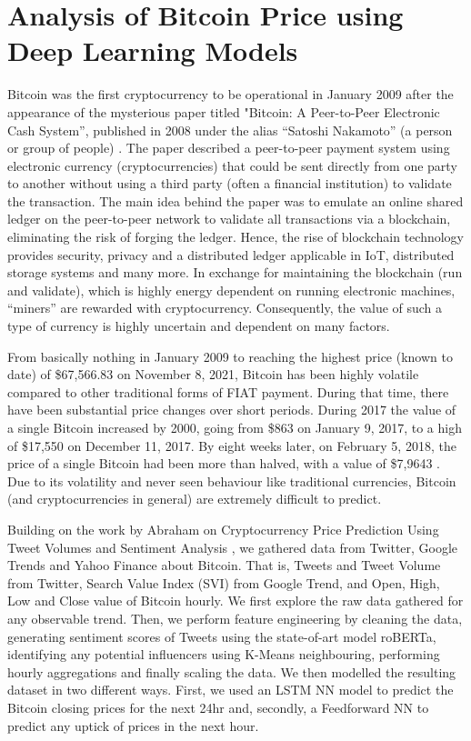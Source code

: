 \chapter{Analysis of Bitcoin Price using Deep Learning Models}
Bitcoin was the first cryptocurrency to be operational in January 2009 after the appearance of the mysterious paper titled "Bitcoin: A Peer-to-Peer Electronic Cash System”, published in 2008 under the alias “Satoshi Nakamoto” (a person or group of people) \cite{satoshi2009}. The paper described a peer-to-peer payment system using electronic currency (cryptocurrencies) that could be sent directly from one party to another without using a third party (often a financial institution) to validate the transaction. The main idea behind the paper was to emulate an online shared ledger on the peer-to-peer network to validate all transactions via a blockchain, eliminating the risk of forging the ledger. Hence, the rise of blockchain technology provides security, privacy and a distributed ledger applicable in IoT, distributed storage systems and many more. In exchange for maintaining the blockchain (run and validate), which is highly energy dependent on running electronic machines, “miners” are rewarded with cryptocurrency. Consequently, the value of such a type of currency is highly uncertain and dependent on many factors.

From basically nothing in January 2009 to reaching the highest price (known to date) of \$67,566.83 on November 8, 2021, Bitcoin has been highly volatile compared to other traditional forms of FIAT payment. During that time, there have been substantial price changes over short periods. During 2017 the value of a single Bitcoin increased by 2000, going from \$863 on January 9, 2017, to a high of \$17,550 on December 11, 2017. By eight weeks later, on February 5, 2018, the price of a single Bitcoin had been more than halved, with a value of \$7,9643 \cite{Abraham2018}. Due to its volatility and never seen behaviour like traditional currencies, Bitcoin (and cryptocurrencies in general) are extremely difficult to predict.

Building on the work by Abraham on Cryptocurrency Price Prediction Using Tweet Volumes and Sentiment Analysis \cite{Abraham2018}, we gathered data from Twitter, Google Trends and Yahoo Finance about Bitcoin. That is, Tweets and Tweet Volume from Twitter, Search Value Index (SVI) from Google Trend, and Open, High, Low and Close value of Bitcoin hourly. We first explore the raw data gathered for any observable trend. Then, we perform feature engineering by cleaning the data, generating sentiment scores of Tweets using the state-of-art model roBERTa, identifying any potential influencers using K-Means neighbouring, performing hourly aggregations and finally scaling the data. We then modelled the resulting dataset in two different ways. First, we used an LSTM NN model to predict the Bitcoin closing prices for the next 24hr and, secondly, a Feedforward NN to predict any uptick of prices in the next hour.
